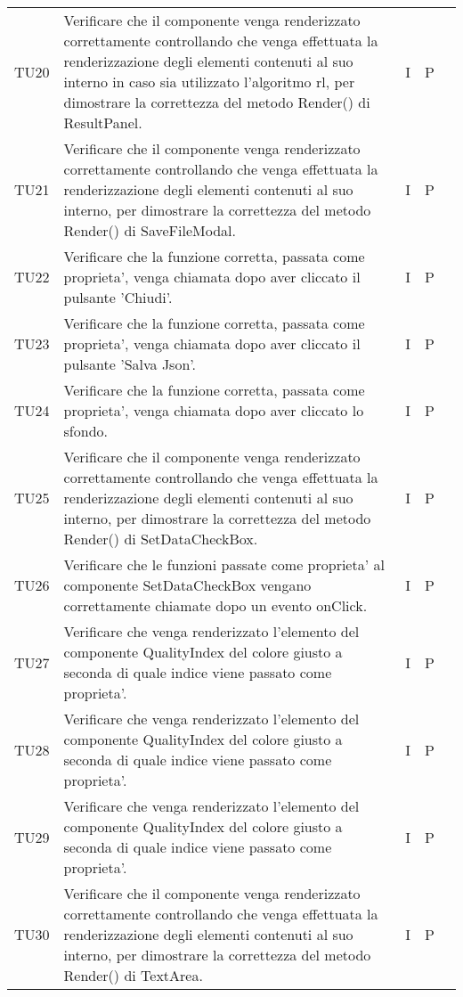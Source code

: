 \begin{longtable} {
		>{}p{15mm} 
		>{}p{79.5mm}
		>{}p{15mm} 
		>{}p{15mm}
		>{}p{0mm}}
	TU20		& Verificare che il componente venga renderizzato correttamente controllando che venga effettuata la renderizzazione degli elementi contenuti al suo interno in caso sia utilizzato l'algoritmo rl, per dimostrare la correttezza del metodo Render() di ResultPanel. & I & P &\TBstrut \\ [2mm]	
	TU21		& Verificare che il componente venga renderizzato correttamente controllando che venga effettuata la renderizzazione degli elementi contenuti al suo interno, per dimostrare la correttezza del metodo Render() di  SaveFileModal.& I & P &\TBstrut \\ [2mm]
	TU22		& Verificare che la funzione corretta, passata come proprieta', venga chiamata dopo aver cliccato il pulsante 'Chiudi'.& I & P &\TBstrut \\ [2mm]
	TU23		& Verificare che la funzione corretta, passata come proprieta', venga chiamata dopo aver cliccato il pulsante 'Salva Json'.& I & P &\TBstrut \\ [2mm]
	TU24		& Verificare che la funzione corretta, passata come proprieta', venga chiamata dopo aver cliccato lo sfondo.& I & P &\TBstrut \\ [2mm]
	TU25		& Verificare che il componente venga renderizzato correttamente controllando che venga effettuata la renderizzazione degli elementi contenuti al suo interno, per dimostrare la correttezza del metodo Render() di  SetDataCheckBox.& I & P &\TBstrut \\ [2mm]
	TU26		& Verificare che le funzioni passate come proprieta' al componente SetDataCheckBox vengano correttamente chiamate dopo un evento onClick.& I & P &\TBstrut \\ [2mm]		
	TU27		& Verificare che venga renderizzato l'elemento del componente QualityIndex del colore giusto a seconda di quale indice viene passato come proprieta'.& I & P &\TBstrut \\ [2mm]
	TU28		& Verificare che venga renderizzato l'elemento del componente QualityIndex del colore giusto a seconda di quale indice viene passato come proprieta'.& I & P &\TBstrut \\ [2mm]
	TU29		& Verificare che venga renderizzato l'elemento del componente QualityIndex del colore giusto a seconda di quale indice viene passato come proprieta'.& I & P &\TBstrut \\ [2mm]
	TU30		& Verificare che il componente venga renderizzato correttamente controllando che venga effettuata la renderizzazione degli elementi contenuti al suo interno, per dimostrare la correttezza del metodo Render() di  TextArea.& I & P &\TBstrut \\ [2mm]	

\end{longtable}

